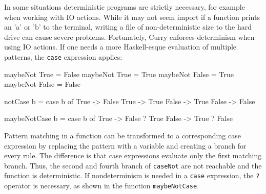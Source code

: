 \documentclass[paper = a4, fleqn, abstract=on, twoside]{scrreprt}
\begin{document}
\par
In some situations deterministic programs are strictly necessary, for example when working with IO actions. While it may not seem import if a function prints an 'a' or 'b' to the terminal, writing a file of non-deterministic size to the hard drive can cause severe problems. Fortunately, Curry enforces determinism when using IO actions. If one needs a more Haskell-esque evaluation of multiple patterns, the \texttt{case} expression applies:
\label{currycase}
\begin{flushleft}
	\begin{minipage}[t]{.3 \linewidth}
		\begin{haskellcode}
maybeNot True  = False
maybeNot True  = True
maybeNot False = True
maybeNot False = False
		\end{haskellcode}
	\end{minipage}
	\hfill
	\vrule
	\hspace{.5 em}
	\begin{minipage}[t]{.25 \linewidth}
		\begin{haskellcode}
notCase b =
  case b of
    True  -> False
    True  -> True
    False -> True
    False -> False
		\end{haskellcode}
	\end{minipage}
	\hfill
	\vrule
	\hspace{.5 em}
	\begin{minipage}[t]{.35 \linewidth}
		\begin{haskellcode}
maybeNotCase b =
  case b of
    True  -> False ? True 
    False -> True  ? False
		\end{haskellcode}
	\end{minipage}
\end{flushleft}
Pattern matching in a function can be transformed to a corresponding case expression by replacing the pattern with a variable and creating a branch for every rule. The difference is that case expressions evaluate only the first matching branch. Thus, the second and fourth branch of \texttt{caseNot} are not reachable and the function is deterministic. If nondeterminism is needed in a \texttt{case} expression, the \texttt{?} operator is necessary, as shown in the function \texttt{maybeNotCase}.
\end{document}
